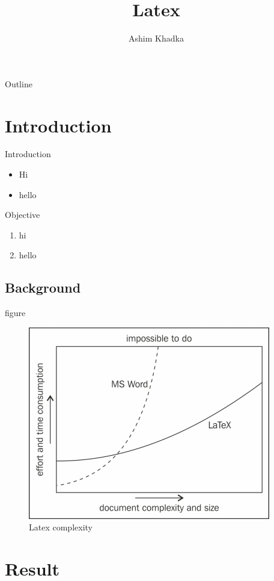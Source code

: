 \documentclass[11pt]{beamer}
\begin{document}
	\author[AK]{Ashim Khadka}
	\title{Latex}
	\date{}
	\begin{frame}[plain]
		\maketitle
	\end{frame}
	\begin{frame}{Outline}
		\tableofcontents
	\end{frame}
	\section{Introduction}
	\begin{frame}{Introduction}
		\begin{itemize}
			\item Hi
			\item<2-> hello
		\end{itemize}
	\end{frame}
	\begin{frame}{Objective}
		\begin{enumerate}
			\item hi
			\item hello
		\end{enumerate}
	\end{frame}
	\subsection{Background}
	\begin{frame}{figure}
		\begin{figure}[h]
			\centering
			\includegraphics[width=0.5\linewidth]{Images/complexity_latex}
			\caption{Latex complexity}
			\label{fig:complexitylatex}
		\end{figure}
	\end{frame}
	\section{Result}
	\begin{frame}
		\frametitle{}
	\end{frame}
\end{document}
